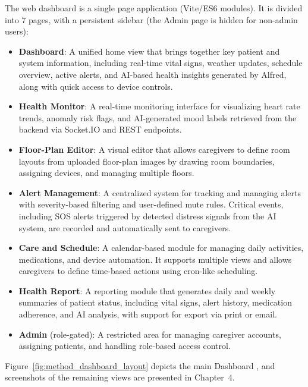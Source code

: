 The web dashboard is a single page application (Vite/ES6 modules). It is divided into 7 pages, with a persistent sidebar (the Admin page is hidden for non-admin users):
\begin{itemize}[itemsep=4pt, parsep=0pt, topsep=4pt]
    \item \textbf{Dashboard}: A unified home view that brings together key patient and system information, including real-time vital signs, weather updates, schedule overview, active alerts, and AI-based health insights generated by Alfred, along with quick access to device controls.

    \item \textbf{Health Monitor}: A real-time monitoring interface for visualizing heart rate trends, anomaly risk flags, and AI-generated mood labels retrieved from the backend via Socket.IO and REST endpoints.

    \item \textbf{Floor-Plan Editor}: A visual editor that allows caregivers to define room layouts from uploaded floor-plan images by drawing room boundaries, assigning devices, and managing multiple floors.

    \item \textbf{Alert Management}: A centralized system for tracking and managing alerts with severity-based filtering and user-defined mute rules. Critical events, including SOS alerts triggered by detected distress signals from the AI system, are recorded and automatically sent to caregivers.

    \item \textbf{Care and Schedule}: A calendar-based module for managing daily activities, medications, and device automation. It supports multiple views and allows caregivers to define time-based actions using cron-like scheduling.

    \item \textbf{Health Report}: A reporting module that generates daily and weekly summaries of patient status, including vital signs, alert history, medication adherence, and AI analysis, with support for export via print or email.

    \item \textbf{Admin} (role-gated): A restricted area for managing caregiver accounts, assigning patients, and handling role-based access control.
\end{itemize}

Figure~\ref{fig:method_dashboard_layout} depicts the main Dashboard , and screenshots of the remaining views are presented in Chapter~4.

